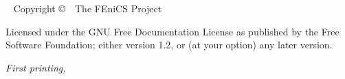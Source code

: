 \begin{fullwidth}
~\vfill
\thispagestyle{empty}
\setlength{\parindent}{0pt}
\setlength{\parskip}{\baselineskip}
Copyright \copyright\ \the\year\ The FEniCS Project

\par{}

\par Licensed under the GNU Free Documentation License as published by
the Free Software Foundation; either version 1.2, or (at your option)
any later version. 

\par\textit{First printing, \monthyear}
\end{fullwidth}
